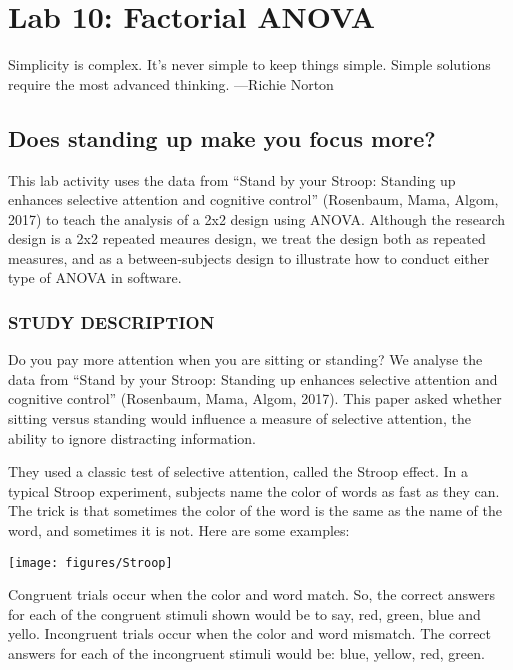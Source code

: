 \documentclass[
]{book}
\begin{document}
\hypertarget{lab-10-factorial-anova}{%
\chapter{Lab 10: Factorial ANOVA}\label{lab-10-factorial-anova}}

{Simplicity is complex. It's never simple to keep things simple. Simple
solutions require the most advanced thinking. ---Richie
Norton}

\hypertarget{does-standing-up-make-you-focus-more}{%
\section{Does standing up make you focus more?}\label{does-standing-up-make-you-focus-more}}

This lab activity uses the data from ``Stand by your Stroop: Standing up
enhances selective attention and cognitive control'' (Rosenbaum, Mama,
Algom, 2017) to teach the analysis of a 2x2 design using ANOVA. Although
the research design is a 2x2 repeated meaures design, we treat the
design both as repeated measures, and as a between-subjects design to
illustrate how to conduct either type of ANOVA in software.

\hypertarget{study-description-4}{%
\subsection{STUDY DESCRIPTION}\label{study-description-4}}

Do you pay more attention when you are sitting or standing? We analyse
the data from ``Stand by your Stroop: Standing up enhances selective
attention and cognitive control'' (Rosenbaum, Mama, Algom, 2017). This
paper asked whether sitting versus standing would influence a measure of
selective attention, the ability to ignore distracting information.

They used a classic test of selective attention, called the Stroop
effect. In a typical Stroop experiment, subjects name the color of words
as fast as they can. The trick is that sometimes the color of the word
is the same as the name of the word, and sometimes it is not. Here are
some examples:

\texttt{[image: figures/Stroop]}

Congruent trials occur when the color and word match. So, the correct
answers for each of the congruent stimuli shown would be to say, red,
green, blue and yello. Incongruent trials occur when the color and word
mismatch. The correct answers for each of the incongruent stimuli would
be: blue, yellow, red, green.
\end{document}
